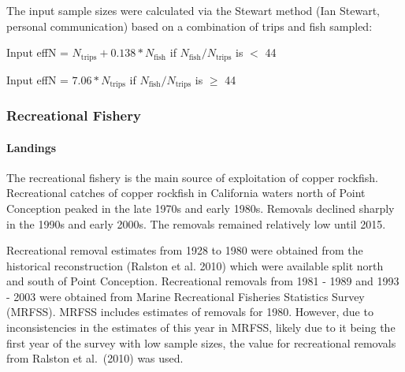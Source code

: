\documentclass[11pt,
  english,
  a4paper,
]{article}
\begin{document}
\leavevmode\tagmcend\tagstructend\par


The input sample sizes were calculated via the Stewart method (Ian Stewart, personal communication) based on a combination of trips and fish sampled:

\leavevmode\tagmcend\tagstructend\par

\begin{centering}

Input effN = $N_{\text{trips}} + 0.138 * N_{\text{fish}}$ if $N_{\text{fish}}/N_{\text{trips}}$ is $<$ 44

Input effN = $7.06 * N_{\text{trips}}$ if $N_{\text{fish}}/N_{\text{trips}}$ is $\geq$ 44

\end{centering}


\hypertarget{recreational-fishery}{%
\subsubsection{Recreational Fishery}\label{recreational-fishery}}

\leavevmode\tagmcend\tagstructend


\hypertarget{landings-1}{%
\paragraph{Landings}\label{landings-1}}

\leavevmode\tagmcend\tagstructend


The recreational fishery is the main source of exploitation of copper rockfish. Recreational catches of copper rockfish in California waters north of Point Conception peaked in the late 1970s and early 1980s. Removals declined sharply in the 1990s and early 2000s. The removals remained relatively low until 2015.

\leavevmode\tagmcend\tagstructend\par


Recreational removal estimates from 1928 to 1980 were obtained from the historical reconstruction {(Ralston et al. 2010)\leavevmode\tagmcend\tagstructend} which were available split north and south of Point Conception. Recreational removals from 1981 - 1989 and 1993 - 2003 were obtained from Marine Recreational Fisheries Statistics Survey (MRFSS). MRFSS includes estimates of removals for 1980. However, due to inconsistencies in the estimates of this year in MRFSS, likely due to it being the first year of the survey with low sample sizes, the value for recreational removals from Ralston et al.~{(2010)\leavevmode\tagmcend\tagstructend} was used.
\end{document}
